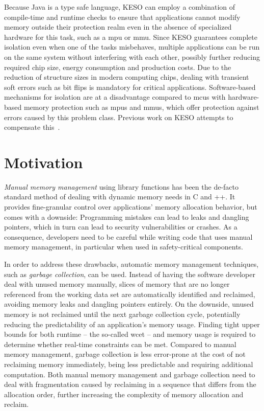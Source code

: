 		Because Java is a type safe language, KESO can employ a combination of compile-time and runtime checks to ensure
		that applications cannot modify memory outside their protection realm even in the absence of specialized hardware
		for this task, such as a \gls{mpu} or \gls{mmu}. Since KESO guarantees complete isolation even when one of the tasks
		misbehaves, multiple applications can be run on the same system without interfering with each other, possibly
		further reducing required chip size, energy consumption and production costs. Due to the reduction of structure
		sizes in modern computing chips, dealing with transient soft errors such as bit flips is mandatory for critical
		applications. Software-based mechanisms for isolation are at a disadvantage compared to \glspl{mcu} with
		hardware-based memory protection such as \glspl{mpu} and \glspl{mmu}, which offer protection against errors caused
		by this problem class. Previous work on KESO attempts to compensate this~\cite{thomm:11:jtres, stilkerich:13:lctes}.

	\section{Motivation}
		\label{sec:intro:motivation}

		\emph{Manual memory management} using library functions has been the de-facto standard method of dealing with
		dynamic memory needs in C and \C++{}. It provides fine-granular control over applications' memory allocation
		behavior, but comes with a downside: Programming mistakes can lead to leaks and dangling pointers, which in turn can
		lead to security vulnerabilities or crashes. As a consequence, developers need to be careful while writing code that
		uses manual memory management, in particular when used in safety-critical components.

		In order to address these drawbacks, automatic memory management techniques, such as \emph{garbage collection}, can
		be used. Instead of having the software developer deal with unused memory manually, slices of memory that are no
		longer referenced from the working data set are automatically identified and reclaimed, avoiding memory leaks and
		dangling pointers entirely. On the downside, unused memory is not reclaimed until the next garbage collection cycle,
		potentially reducing the predictability of an application's memory usage. Finding tight upper bounds for both
		runtime – the so-called \gls{wcet} – and memory usage is required to determine whether real-time constraints can be
		met. Compared to manual memory management, garbage collection is less error-prone at the cost of not reclaiming
		memory immediately, being less predictable and requiring additional computation. Both manual memory management and
		garbage collection need to deal with fragmentation caused by reclaiming in a sequence that differs from the
		allocation order, further increasing the complexity of memory allocation and reclaim.

